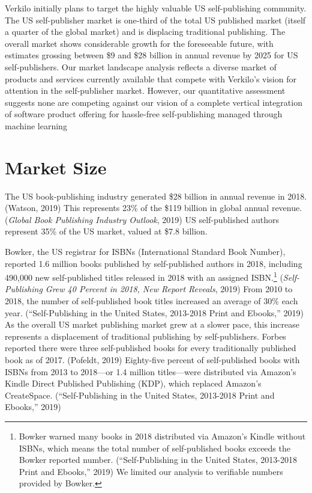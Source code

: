 \documentclass[11pt,openany]{book}
\begin{document}
Verkilo initially plans to target the highly valuable US self-publishing
community. The US self-publisher market is one-third of the total US
published market (itself a quarter of the global market) and is
displacing traditional publishing. The overall market shows considerable
growth for the foreseeable future, with estimates grossing between \$9
and \$28 billion in annual revenue by 2025 for US self-publishers. Our
market landscape analysis reflects a diverse market of products and
services currently available that compete with Verkilo's vision for
attention in the self-publisher market. However, our quantitative
assessment suggests none are competing against our vision of a complete
vertical integration of software product offering for hassle-free
self-publishing managed through machine learning

\newpage

\hypertarget{market-size}{%
\section{Market Size}\label{market-size}}

The US book-publishing industry generated \$28 billion in annual revenue
in 2018. (Watson, 2019) This represents 23\% of the \$119 billion in
global annual revenue. (\emph{Global Book Publishing Industry Outlook},
2019) US self-published authors represent 35\% of the US market, valued
at \$7.8 billion.

Bowker, the US registrar for ISBNs (International Standard Book Number),
reported 1.6 million books published by self-published authors in 2018,
including 490,000 new self-published titles released in 2018 with an
assigned ISBN.\footnote{Bowker warned many books in 2018 distributed via
  Amazon's Kindle without ISBNs, which means the total number of
  self-published books exceeds the Bowker reported number.
  (``Self-Publishing in the United States, 2013-2018 Print and Ebooks,''
  2019) We limited our analysis to verifiable numbers provided by
  Bowker.} (\emph{Self-Publishing Grew 40 Percent in 2018, New Report
Reveals}, 2019) From 2010 to 2018, the number of self-published book
titles increased an average of 30\% each year. (``Self-Publishing in the
United States, 2013-2018 Print and Ebooks,'' 2019) As the overall US
market publishing market grew at a slower pace, this increase represents
a displacement of traditional publishing by self-publishers. Forbes
reported there were three self-published books for every traditionally
published book as of 2017. (Pofeldt, 2019) Eighty-five percent of
self-published books with ISBNs from 2013 to 2018---or 1.4 million
titles---were distributed via Amazon's Kindle Direct Published
Publishing (KDP), which replaced Amazon's CreateSpace.
(``Self-Publishing in the United States, 2013-2018 Print and Ebooks,''
2019)
\end{document}
